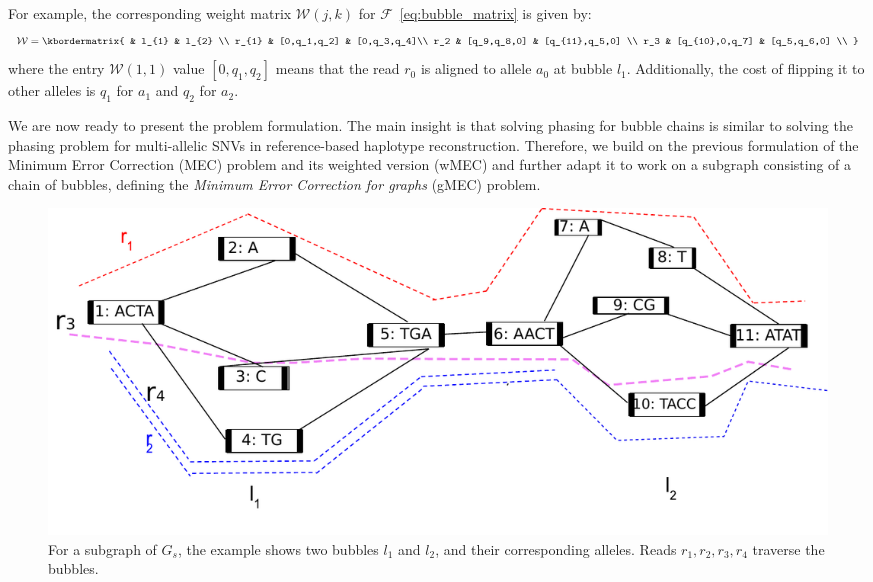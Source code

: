 For example, the corresponding weight matrix $\mathcal{W}(j,k)$ for $\mathcal{F}$~\eqref{eq:bubble_matrix} is given by:
\begin{equation}\label{eq:weight_matrix}
  \mathcal{W}  = \kbordermatrix{
     & l_{1}       & l_{2}  \\
    r_{1}       & [0,q_1,q_2] &  [0,q_3,q_4]\\
    r_2 & [q_9,q_8,0] & [q_{11},q_5,0] \\
    r_3 & [q_{10},0,q_7] & [q_5,q_6,0] \\
  }
\end{equation}
where the entry $\mathcal{W}(1,1)$ value $[0,q_1,q_2]$ means that the read $r_0$ is aligned to allele $a_0$ at bubble $l_1$.
Additionally, the cost of flipping it to other alleles is $q_1$ for $a_1$ and $q_2$ for $a_2$.

We are now ready to present the problem formulation.
The main insight is that solving phasing for bubble chains is similar to solving the phasing problem for multi-allelic SNVs in reference-based haplotype reconstruction.
Therefore, we build on the previous formulation of the Minimum Error Correction (MEC) problem \citep{Lancia2001} and its weighted version (wMEC) \citep{lippert2002algorithmic,Patterson2015} and further adapt it to work on a subgraph consisting of a chain of bubbles, defining the \emph{Minimum Error Correction for graphs} (gMEC) problem.

\begin{figure}[t!]\centering
\includegraphics[width=\columnwidth]{wmecfig.pdf}
\caption{For a subgraph of $G_s$, the example shows two bubbles $l_1$ and $l_2$, and their corresponding alleles. Reads $r_1,r_2,r_3,r_4$ traverse the bubbles.}
\label{fig:wmec}
\end{figure}

